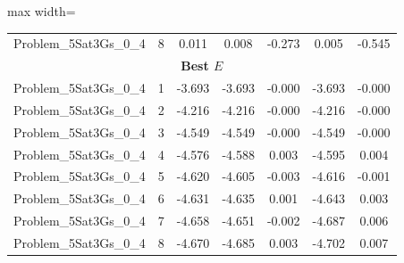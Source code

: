 \begin{table}[!htbp]
\begin{adjustbox}{max width=\columnwidth}
\begin{tabularx}{\columnwidth}{c|c c c c c c}
            Problem\_5Sat3Gs\_0\_4 & 8 & 0.011 & 0.008 & -0.273 & 0.005 & -0.545 \\
            \multicolumn{7}{c}{\textbf{Best $E$}} \\ \midrule
            Problem\_5Sat3Gs\_0\_4 & 1 & -3.693 & -3.693 & -0.000 & -3.693 & -0.000 \\
            Problem\_5Sat3Gs\_0\_4 & 2 & -4.216 & -4.216 & -0.000 & -4.216 & -0.000 \\
            Problem\_5Sat3Gs\_0\_4 & 3 & -4.549 & -4.549 & -0.000 & -4.549 & -0.000 \\
            Problem\_5Sat3Gs\_0\_4 & 4 & -4.576 & -4.588 & 0.003 & -4.595 & 0.004 \\
            Problem\_5Sat3Gs\_0\_4 & 5 & -4.620 & -4.605 & -0.003 & -4.616 & -0.001 \\
            Problem\_5Sat3Gs\_0\_4 & 6 & -4.631 & -4.635 & 0.001 & -4.643 & 0.003 \\
            Problem\_5Sat3Gs\_0\_4 & 7 & -4.658 & -4.651 & -0.002 & -4.687 & 0.006 \\
            Problem\_5Sat3Gs\_0\_4 & 8 & -4.670 & -4.685 & 0.003 & -4.702 & 0.007 \\
            \bottomrule
        \end{tabularx}
    \end{adjustbox}
\end{table}

